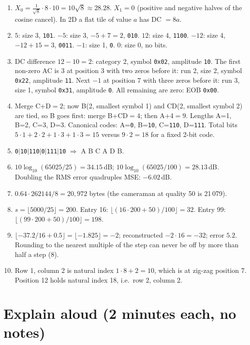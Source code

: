 \begin{enumerate}[label=\textbf{D\arabic*.},leftmargin=1.2cm]
\item $X_0=\tfrac{1}{\sqrt8}\cdot 8\cdot10=10\sqrt8\approx28.28$. $X_1=0$ (positive and negative halves of the cosine cancel). In 2D a flat tile of value $a$ has DC $=8a$.
\item $5$: size 3, \texttt{101}. $-5$: size 3, $-5+7=2$, \texttt{010}. $12$: size 4, \texttt{1100}. $-12$: size 4, $-12+15=3$, \texttt{0011}. $-1$: size 1, \texttt{0}. $0$: size 0, no bits.
\item DC difference $12-10=2$: category 2, symbol \texttt{0x02}, amplitude \texttt{10}. The first non-zero AC is $3$ at position 3 with two zeros before it: run 2, size 2, symbol \texttt{0x22}, amplitude \texttt{11}. Next $-1$ at position 7 with three zeros before it: run 3, size 1, symbol \texttt{0x31}, amplitude \texttt{0}. All remaining are zero: EOB \texttt{0x00}.
\item Merge C+D$=2$; now B(2, smallest symbol 1) and CD(2, smallest symbol 2) are tied, so B goes first: merge B+CD$=4$; then A+4$=9$. Lengths A=1, B=2, C=3, D=3. Canonical codes: A=\texttt{0}, B=\texttt{10}, C=\texttt{110}, D=\texttt{111}. Total bits $5\cdot1+2\cdot2+1\cdot3+1\cdot3=15$ versus $9\cdot2=18$ for a fixed 2-bit code.
\item \texttt{0}$|$\texttt{10}$|$\texttt{110}$|$\texttt{0}$|$\texttt{111}$|$\texttt{10} $\Rightarrow$ A B C A D B.
\item $10\log_{10}(65025/25)=34.15$\,dB; $10\log_{10}(65025/100)=28.13$\,dB. Doubling the RMS error quadruples MSE: $-6.02$\,dB.
\item $0.64\cdot262144/8=20{,}972$ bytes (the cameraman at quality 50 is 21\,079).
\item $s=\lfloor5000/25\rfloor=200$. Entry 16: $\lfloor(16\cdot200+50)/100\rfloor=32$. Entry 99: $\lfloor(99\cdot200+50)/100\rfloor=198$.
\item $\lfloor-37.2/16+0.5\rfloor=\lfloor-1.825\rfloor=-2$; reconstructed $-2\cdot16=-32$; error $5.2$. Rounding to the nearest multiple of the step can never be off by more than half a step (8).
\item Row 1, column 2 is natural index $1\cdot8+2=10$, which is at zig-zag position 7. Position 12 holds natural index 18, i.e.\ row 2, column 2.
\end{enumerate}

\section{Explain aloud (2 minutes each, no notes)}

